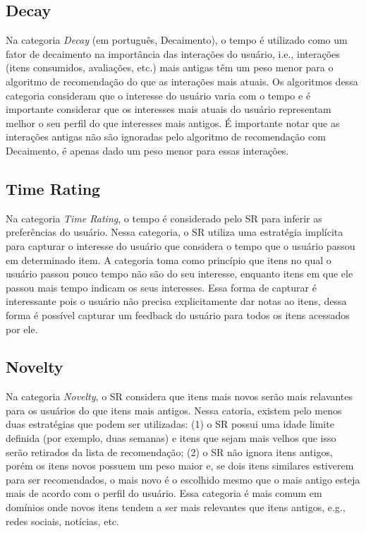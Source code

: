 \subsection{Decay}\label{section:decay}

Na categoria \textit{Decay} (em português, Decaimento), o tempo é utilizado como um fator de decaimento na importância das interações do usuário, i.e.,
interações (itens consumidos, avaliações, etc.) mais antigas têm um peso menor para o algoritmo de recomendação do que
as interações mais atuais. Os algoritmos dessa categoria consideram que o interesse do usuário varia com o tempo e é
importante considerar que os interesses mais atuais do usuário representam melhor o seu perfil do que interesses mais
antigos. É importante notar que as interações antigas não são ignoradas pelo algoritmo de recomendação com Decaimento, é
apenas dado um peso menor para essas interações.

\subsection{Time Rating}

Na categoria \textit{Time Rating}, o tempo é considerado pelo SR para inferir as preferências do usuário. Nessa categoria, o SR
utiliza uma estratégia implícita para capturar o interesse do usuário que considera o tempo que o usuário passou em
determinado item. A categoria toma como princípio que itens no qual o usuário passou pouco tempo não são do seu
interesse, enquanto itens em que ele passou mais tempo indicam os seus interesses. Essa forma de capturar é interessante
pois o usuário não precisa explicitamente dar notas ao itens, dessa forma é possível capturar um feedback do usuário
para todos os itens acessados por ele.

\subsection{Novelty}

Na categoria \textit{Novelty}, o SR considera que itens mais novos serão mais relavantes para os usuários do que itens mais
antigos. Nessa catoria, existem pelo menos duas estratégias que podem ser utilizadas: (1) o SR possui uma idade limite
definida (por exemplo, duas semanas) e itens que sejam mais velhos que isso serão retirados da lista de recomendação;
(2) o SR não ignora itens antigos, porém os itens novos possuem um peso maior e, se dois itens similares estiverem para
ser recomendados, o mais novo é o escolhido mesmo que o mais antigo esteja mais de acordo com o perfil do usuário.
Essa categoria é mais comum em domínios onde novos itens tendem a ser mais relevantes que itens antigos, e.g., redes
sociais, notícias, etc.

